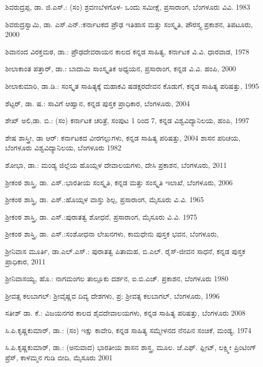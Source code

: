 \noindent
ಶಿವರುದ್ರಪ್ಪ, ಡಾ. ಜಿ.ಎಸ್​.: (ಸಂ) ಶ್ರವಣಬೆಳಗೊಳ- ಒಂದು ಸಮೀಕ್ಷೆ, ಪ್ರಸಾರಾಂಗ, ಬೆಂಗಳೂರು ವಿವಿ. 1983

\noindent
ಶಿವರುದ್ರಸ್ವಾಮಿ, ಡಾ. ಎಸ್​.ಎನ್​.:ಕರ್ನಾಟಕದ ಪ್ರೌಢ ಇತಿಹಾಸ ಮತ್ತು ಸಂಸ್ಕೃತಿ, ಪೌರಸ್ತ್ಯ ಪ್ರಕಾಶನ, ತಿಪಟೂರು, 2000

\noindent
ಶಿವಾನಂದ ವಿರಕ್ತಮಠ, ಡಾ.: ಪ್ರೌಢದೇವರಾಯನ ಕಾಲದ ಕನ್ನಡ ಸಾಹಿತ್ಯ, ಕರ್ನಾಟಕ ವಿ.ವಿ. ಧಾರವಾಡ, 1978

\noindent
ಶೀಲಾಕಾಂತ ಪತ್ತಾರ್​, ಡಾ.: ಬಾದಾಮಿ ಸಾಂಸ್ಕೃತಿಕ ಅಧ್ಯಯನ, ಪ್ರಸಾರಾಂಗ, ಕನ್ನಡ ವಿ.ವಿ. ಹಂಪಿ, 2000

\noindent
ಶೀಲಾಕುಮಾರಿ, ಡಾ.ಡಿ.: ಸಂಸ್ಕೃತ ಸಾಹಿತ್ಯಕ್ಕೆ ಮಹಾಕವಿ ಷಡಕ್ಷರದೇವನ ಕೊಡುಗೆ, ಕನ್ನಡ ಸಾಹಿತ್ಯ ಪರಿಷತ್ತು, 1995

\noindent
ಶೆಟ್ಟರ್​, ಡಾ. ಷ.: ಸಾವಿಗೆ ಆಹ್ವಾನ, ಕನ್ನಡ ಪುಸ್ತಕ ಪ್ರಾಧಿಕಾರ, ಬೆಂಗಳೂರು, 2004

\noindent
ಶೇಖ್​ ಅಲಿ,ಡಾ. ಬಿ.: (ಸಂ) ಕರ್ನಾಟಕ ಚರಿತ್ರೆ, ಸಂಪುಟ 1 ರಿಂದ 7, ಕನ್ನಡ ವಿಶ್ವವಿದ್ಯಾನಿಲಯ, ಹಂಪಿ, 1997

\noindent
ಶೇಷ ಶಾಸ್ತ್ರೀ, ಡಾ ಆರ್​: ಕರ್ನಾಟಕದ ವೀರಗಲ್ಲುಗಳು, ಕನ್ನಡ ಸಾಹಿತ್ಯ ಪರಿಷತ್ತು, 2004 ಶಾಸನ ಪರಿಚಯ, ಬೆಂಗಳೂರು ವಿಶ್ವವಿದ್ಯಾನಿಲಯ, ಬೆಂಗಳೂರು 1982

\noindent
ಶೋಭಾ, ಡಾ.: ಮಂಡ್ಯ ಜಿಲ್ಲೆಯ ಹೊಯ್ಸಳ ದೇವಾಲಯಗಳು, ದೇಸಿ ಪ್ರಕಾಶನ, ಬೆಂಗಳೂರು, 2011

\noindent
ಶ‍್ರೀಕಂಠ ಶಾಸ್ತ್ರಿ, ಡಾ. ಎಸ್​.:ಭಾರತೀಯ ಸಂಸ್ಕೃತಿ, ಕನ್ನಡ ಮತ್ತು ಸಂಸ್ಕೃತಿ ಇಲಾಖೆ, ಬೆಂಗಳೂರು, 2006

\noindent
ಶ‍್ರೀಕಂಠ ಶಾಸ್ತ್ರಿ, ಡಾ. ಎಸ್​.:ಹೊಯ್ಸಳ ವಾಸ್ತು ಶಿಲ್ಪ, ಪ್ರಸಾರಾಂಗ, ಮೈಸೂರು ವಿ.ವಿ. 1965

\noindent
ಶ‍್ರೀಕಂಠ ಶಾಸ್ತ್ರಿ, ಡಾ. ಎಸ್​.:ಪುರಾತತ್ವ ಶೋಧನೆ, ಪ್ರಸಾರಾಂಗ, ಮೈಸೂರು ವಿ.ವಿ. 1975

\noindent
ಶ‍್ರೀಕಂಠ ಶಾಸ್ತ್ರಿ, ಡಾ. ಎಸ್​.:ಸಂಶೋಧನಾ ಲೇಖನಗಳು, ಕಾಮಧೇನು ಪುಸ್ತಕ ಭವನ, ಬೆಂಗಳೂರು,

\noindent
ಶ‍್ರೀನಿವಾಸ ಮೂರ್ತಿ, ಡಾ.ಎಲ್​.ಎಸ್​.: ಪುರಾತತ್ವ ಪಿತಾಮಹ, ಬಿ.ಎಲ್​. ರೈಸ್​-ಜೀವನ ಸಾಧನೆ, ಕನ್ನಡ ಪುಸ್ತಕ ಪ್ರಾಧಿಕಾರ, 2011

\noindent
ಶ‍್ರೀನಿವಾಸಯ್ಯ, ಹೊ.: ನಾಗಮಂಗಲ ತಾಲ್ಲೂಕು ದರ್ಶನ, ಐ.ಬಿ.ಎಚ್​. ಪ್ರಕಾಶನ, ಬೆಂಗಳೂರು 1980

\noindent
ಶ‍್ರೀವತ್ಸ ಕಲಬಾಗಲ್​: ಶ‍್ರೀವೈಷ್ಣವ ದಿವ್ಯ ದೇಶಗಳು, ಪ್ರ: ಶ‍್ರೀವತ್ಸ ಕಲಬಾಗಲ್​, ಬೆಂಗಳೂರು, 1996

\noindent
ಸತೀಶ್​ ಡಾ. ಕೆ.: ವಿಜಯನಗರ ಕಾಲದ ಶೈವದೇವಾಲಯಗಳು, ಕನ್ನಡ ಸಾಹಿತ್ಯ ಪರಿಷತ್ತು, ಬೆಂಗಳೂರು 2008

\noindent
ಸಿ.ಪಿ.ಕೃಷ್ಣಕುಮಾರ್​, ಡಾ.: (ಸಂ) ಇಕ್ಷು ಕಾವೇರಿ, ಕನ್ನಡ ಸಾಹಿತ್ಯ ಸಮ್ಮೇಳನದ ನೆನಪಿನ ಸಂಚಿಕೆ, ಮಂಡ್ಯ, 1974

\noindent
ಸಿ.ಪಿ.ಕೃಷ್ಣಕುಮಾರ್​, ಡಾ.: (ಅನುವಾದ) ಭಾರತೀಯ ಶಾಸನ ಶಾಸ್ತ್ರ, ಮೂಲ. ಜೆ.ಎಫ್​. ಫ್ಲೀಟ್​, ಲಕ್ಷ್ಮೀ ಪ್ರಿಂಟಿಂಗ್​ ಪ್ರೆಸ್​, ಕಾಳಮ್ಮನ ಗುಡಿ ಬೀದಿ, ಮೈಸೂರು 2001

